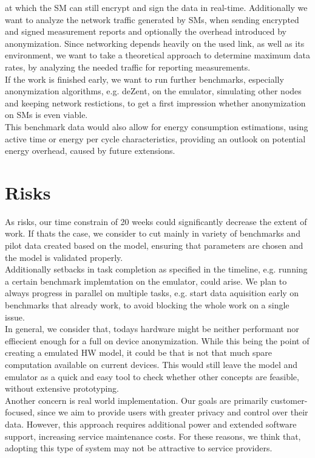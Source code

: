 \documentclass[english]{tudscrartcl}
\begin{document}
	at which the SM can still encrypt and sign the data in real-time.
	Additionally we want to analyze the network traffic generated by SMs,
	when sending encrypted and signed measurement reports and optionally the overhead introduced by anonymization.
	Since networking depends heavily on the used link, as well as its environment,
	we want to take a theoretical approach to determine maximum data rates,
	by analyzing the needed traffic for reporting measurements.
	\\ %
  	If the work is finished early, we want to run further benchmarks, especially anonymization algorithms, e.g. deZent, on the emulator,
	simulating other nodes and keeping network restictions, to get a first impression whether anonymization on SMs is even viable.
	\\ %
  	This benchmark data would also allow for energy consumption estimations, using active time or energy per cycle characteristics,
	providing an outlook on potential energy overhead, caused by future extensions.
	
	\section{Risks}
	\normalsize
  	As risks, our time constrain of 20 weeks could significantly decrease the extent of work.
	If thats the case, we consider to cut mainly in variety of benchmarks and pilot data created based on the model,
	ensuring that parameters are chosen and the model is validated properly.
	\\ %
	Additionally setbacks in task completion as specified in the timeline, e.g. running a certain benchmark implemtation on the emulator, could arise.
	We plan to always progress in parallel on multiple tasks, e.g. start data aquisition early on benchmarks that already work, to avoid blocking the whole work on a single issue.
	\\ %
	In general, we consider that, todays hardware might be neither performant nor effiecient enough for a full on device anonymization.
	While this being the point of creating a emulated HW model, it could be that is not that much spare computation available on current devices.
	This would still leave the model and emulator as a quick and easy tool to check whether other concepts are feasible, without extensive prototyping.
  	\\ %
	Another concern is real world implementation.
	Our goals are primarily customer-focused, since we aim to provide users with greater privacy and control over their data.
	However, this approach requires additional power and extended software support, increasing service maintenance costs.
	For these reasons, we think that, adopting this type of system may not be attractive to service providers.
	
\end{document}
